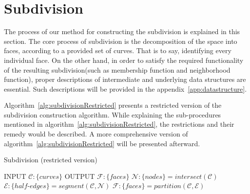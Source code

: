 \section{Subdivision}
The process of our method for constructing the subdivision is explained in this section.
The core process of subdivision is the decomposition of the space into faces, according to a provided set of curves.
That is to say, identifying every individual face.
On the other hand, in order to satisfy the required functionality of the resulting subdivision(such as membership function and neighborhood function), proper descriptions of intermediate and underlying data structures are essential.
Such descriptions will be provided in the appendix~\ref{app:datastructure}.\bigskip

Algorithm~\ref{alg:subdivisionRestricted} presents a restricted version of the subdivision construction algorithm.
While explaining the sub-procedures mentioned in algorithm~\ref{alg:subdivisionRestricted}, the restrictions and their remedy would be described.
A more comprehensive version of algorithm~\ref{alg:subdivisionRestricted} will be presented afterward.

\begin{algorithm}
  \caption {Subdivision (restricted version)}
  \label{alg:subdivisionRestricted}
  \begin{algorithmic}    
    \STATE INPUT  $\mathcal{C}:\{curves\}$
    \STATE OUTPUT  $\mathcal{F}:\{faces\}$
    \STATE \quad
    \STATE $\mathcal{N}:\{nodes\} = \mathit{intersect} \left( \mathcal{C} \right)$
    \STATE $\mathcal{E}:\{half\text{-}edges\} = \mathit{segment} \left( \mathcal{C}, \mathcal{N} \right)$
    \STATE $ \mathcal{F}:\{faces\} = \mathit{partition} \left(\mathcal{C},\mathcal{E} \right)$
  \end{algorithmic}
\end{algorithm}

